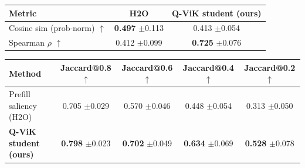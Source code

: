 \begin{tabular}{l c c}
\toprule
\textbf{Metric} & \textbf{H2O} & \textbf{Q-ViK student (ours)} \\
\midrule
Cosine sim (prob-norm) $\uparrow$ & \textbf{0.497} $\pm$0.113 & 0.413 $\pm$0.054 \\
Spearman $\rho$ $\uparrow$ & 0.412 $\pm$0.099 & \textbf{0.725} $\pm$0.076 \\
\bottomrule
\end{tabular}

\begin{tabular}{l c c c c }
\toprule
\textbf{Method} & \textbf{Jaccard@0.8 $\uparrow$} & \textbf{Jaccard@0.6 $\uparrow$} & \textbf{Jaccard@0.4 $\uparrow$} & \textbf{Jaccard@0.2 $\uparrow$} \\
\midrule
Prefill saliency (H2O) & 0.705 $\pm$0.029 & 0.570 $\pm$0.046 & 0.448 $\pm$0.054 & 0.313 $\pm$0.050 \\
\textbf{Q-ViK student (ours)} & \textbf{0.798} $\pm$0.023 & \textbf{0.702} $\pm$0.049 & \textbf{0.634} $\pm$0.069 & \textbf{0.528} $\pm$0.078 \\
\bottomrule
\end{tabular}
